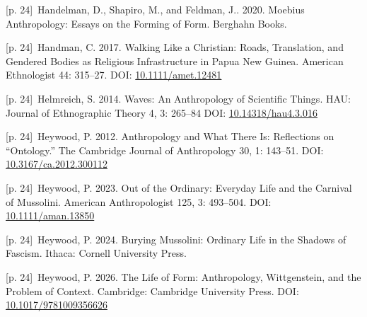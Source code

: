 \documentclass[10pt,a4paper]{article}
\begin{document}
\noindent\begin{minipage}[t]{\linewidth}{\scriptsize\color{gray} [p. 24]}\ Handelman, D., Shapiro, M., and Feldman, J.. 2020. Moebius Anthropology: Essays on the Forming of Form. Berghahn Books.\par\end{minipage}\par
\noindent\begin{minipage}[t]{\linewidth}{\scriptsize\color{gray} [p. 24]}\ Handman, C. 2017. Walking Like a Christian: Roads, Translation, and Gendered Bodies as Religious Infrastructure in Papua New Guinea. American Ethnologist 44: 315–27. DOI: \url{10.1111/amet.12481}\par\end{minipage}\par
\noindent\begin{minipage}[t]{\linewidth}{\scriptsize\color{gray} [p. 24]}\ Helmreich, S. 2014. Waves: An Anthropology of Scientific Things. HAU: Journal of Ethnographic Theory 4, 3: 265–84 DOI: \url{10.14318/hau4.3.016}\par\end{minipage}\par
\noindent\begin{minipage}[t]{\linewidth}{\scriptsize\color{gray} [p. 24]}\ Heywood, P. 2012. Anthropology and What There Is: Reflections on “Ontology.” The Cambridge Journal of Anthropology 30, 1: 143–51. DOI: \url{10.3167/ca.2012.300112}\par\end{minipage}\par
\noindent\begin{minipage}[t]{\linewidth}{\scriptsize\color{gray} [p. 24]}\ Heywood, P. 2023. Out of the Ordinary: Everyday Life and the Carnival of Mussolini. American Anthropologist 125, 3: 493–504. DOI: \url{10.1111/aman.13850}\par\end{minipage}\par
\noindent\begin{minipage}[t]{\linewidth}{\scriptsize\color{gray} [p. 24]}\ Heywood, P. 2024. Burying Mussolini: Ordinary Life in the Shadows of Fascism. Ithaca: Cornell University Press.\par\end{minipage}\par
\noindent\begin{minipage}[t]{\linewidth}{\scriptsize\color{gray} [p. 24]}\ Heywood, P. 2026. The Life of Form: Anthropology, Wittgenstein, and the Problem of Context. Cambridge: Cambridge University Press. DOI: \url{10.1017/9781009356626}\par\end{minipage}\par
\end{document}
